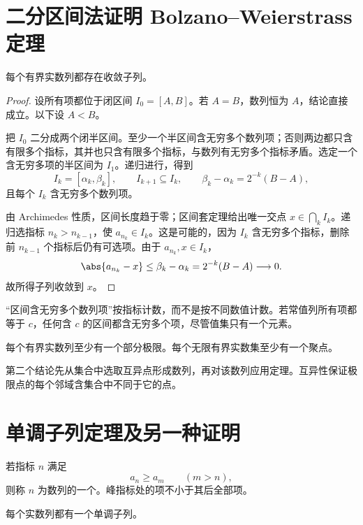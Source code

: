 \section{二分区间法证明 Bolzano--Weierstrass 定理}

\begin{theorem}
每个有界实数列都存在收敛子列。
\end{theorem}

\begin{proof}
设所有项都位于闭区间 \(I_0=[A,B]\)。若 \(A=B\)，数列恒为 \(A\)，结论直接成立。以下设 \(A<B\)。

把 \(I_0\) 二分成两个闭半区间。至少一个半区间含无穷多个数列项；否则两边都只含有限多个指标，其并也只含有限多个指标，与数列有无穷多个指标矛盾。选定一个含无穷多项的半区间为 \(I_1\)。递归进行，得到
\[
 I_k=[\alpha_k,\beta_k],\qquad
 I_{k+1}\subseteq I_k,\qquad
 \beta_k-\alpha_k=2^{-k}(B-A),
\]
且每个 \(I_k\) 含无穷多个数列项。

由 Archimedes 性质，区间长度趋于零；区间套定理给出唯一交点 \(x\in\bigcap_kI_k\)。递归选指标 \(n_k>n_{k-1}\)，使
\(a_{n_k}\in I_k\)。这是可能的，因为 \(I_k\) 含无穷多个指标，删除前 \(n_{k-1}\) 个指标后仍有可选项。由于 \(a_{n_k},x\in I_k\)，
\[
 \abs{a_{n_k}-x}\le\beta_k-\alpha_k
 =2^{-k}(B-A)\longrightarrow0.
\]
故所得子列收敛到 \(x\)。
\end{proof}

“区间含无穷多个数列项”按指标计数，而不是按不同数值计数。若常值列所有项都等于 \(c\)，任何含 \(c\) 的区间都含无穷多个项，尽管值集只有一个元素。

\begin{corollary}
每个有界实数列至少有一个部分极限。每个无限有界实数集至少有一个聚点。
\end{corollary}

第二个结论先从集合中选取互异点形成数列，再对该数列应用定理。互异性保证极限点的每个邻域含集合中不同于它的点。

\section{单调子列定理及另一种证明}

\begin{definition}
若指标 \(n\) 满足
\[
 a_n\ge a_m\qquad(m>n),
\]
则称 \(n\) 为数列的一个。峰指标处的项不小于其后全部项。
\end{definition}

\begin{theorem}[单调子列定理]
每个实数列都有一个单调子列。
\end{theorem}

